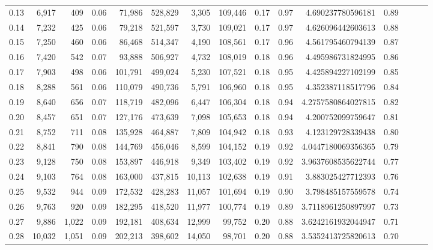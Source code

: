 \begin{tabular}{rrrrrrrrrrrrrrr}
0.13 &   6,917 &    409 &  0.06 &   71,986 &  528,829 &    3,305 &  109,446 &  0.17 &  0.97 &     4.690237780596181 &      0.89 \\
0.14 &   7,232 &    425 &  0.06 &   79,218 &  521,597 &    3,730 &  109,021 &  0.17 &  0.97 &     4.626096442603613 &      0.88 \\
0.15 &   7,250 &    460 &  0.06 &   86,468 &  514,347 &    4,190 &  108,561 &  0.17 &  0.96 &     4.561795460794139 &      0.87 \\
0.16 &   7,420 &    542 &  0.07 &   93,888 &  506,927 &    4,732 &  108,019 &  0.18 &  0.96 &     4.495986731824995 &      0.86 \\
0.17 &   7,903 &    498 &  0.06 &  101,791 &  499,024 &    5,230 &  107,521 &  0.18 &  0.95 &     4.425894227102199 &      0.85 \\
0.18 &   8,288 &    561 &  0.06 &  110,079 &  490,736 &    5,791 &  106,960 &  0.18 &  0.95 &     4.352387118517796 &      0.84 \\
0.19 &   8,640 &    656 &  0.07 &  118,719 &  482,096 &    6,447 &  106,304 &  0.18 &  0.94 &    4.2757580864027815 &      0.82 \\
0.20 &   8,457 &    651 &  0.07 &  127,176 &  473,639 &    7,098 &  105,653 &  0.18 &  0.94 &     4.200752099759647 &      0.81 \\
0.21 &   8,752 &    711 &  0.08 &  135,928 &  464,887 &    7,809 &  104,942 &  0.18 &  0.93 &     4.123129728339438 &      0.80 \\
0.22 &   8,841 &    790 &  0.08 &  144,769 &  456,046 &    8,599 &  104,152 &  0.19 &  0.92 &    4.0447180069356365 &      0.79 \\
0.23 &   9,128 &    750 &  0.08 &  153,897 &  446,918 &    9,349 &  103,402 &  0.19 &  0.92 &    3.9637608535622744 &      0.77 \\
0.24 &   9,103 &    764 &  0.08 &  163,000 &  437,815 &   10,113 &  102,638 &  0.19 &  0.91 &     3.883025427712393 &      0.76 \\
0.25 &   9,532 &    944 &  0.09 &  172,532 &  428,283 &   11,057 &  101,694 &  0.19 &  0.90 &     3.798485157559578 &      0.74 \\
0.26 &   9,763 &    920 &  0.09 &  182,295 &  418,520 &   11,977 &  100,774 &  0.19 &  0.89 &    3.7118961250897997 &      0.73 \\
0.27 &   9,886 &  1,022 &  0.09 &  192,181 &  408,634 &   12,999 &   99,752 &  0.20 &  0.88 &    3.6242161932044947 &      0.71 \\
0.28 &  10,032 &  1,051 &  0.09 &  202,213 &  398,602 &   14,050 &   98,701 &  0.20 &  0.88 &    3.5352413725820613 &      0.70 \\

\end{tabular}
